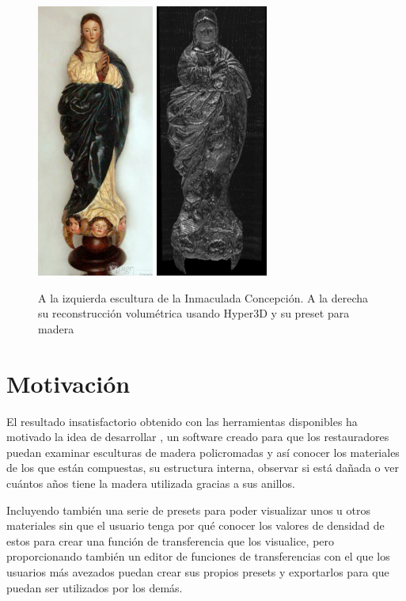 \begin{figure}[H]
	\centering
	\includegraphics[height=9cm]{imagenes/inmaculada_concepcion_real}
	\includegraphics[height=9cm]{imagenes/inmaculada_concepcion_hyper3d}
	\caption{A la izquierda escultura de la Inmaculada Concepción. A la derecha su reconstrucción volumétrica usando Hyper3D y su preset para madera}
	\label{fig:hyper3d_results}
\end{figure}

\section{Motivación}

El resultado insatisfactorio obtenido con las herramientas disponibles ha motivado la idea de desarrollar \myTitle, un software creado para que los restauradores puedan examinar esculturas de madera policromadas y así conocer los materiales de los que están compuestas, su estructura interna, observar si está dañada o ver cuántos años tiene la madera utilizada gracias a sus anillos.

Incluyendo también una serie de presets para poder visualizar unos u otros materiales sin que el usuario tenga por qué conocer los valores de densidad de estos para crear una función de transferencia que los visualice, pero proporcionando también un editor de funciones de transferencias con el que los usuarios más avezados puedan crear sus propios presets y exportarlos para que puedan ser utilizados por los demás.
